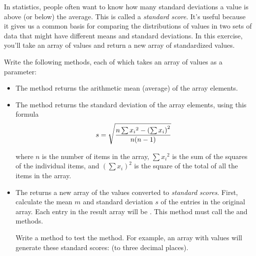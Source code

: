 \begin{exercise}
\label{ex:standardize}
In statistics, people often want to know how many standard deviations a value is above (or below) the average. This is called a {\em standard score}. It's useful because it gives us a common basis for comparing the distributions of values in two sets of data that might have different means and standard deviations. In this exercise, you'll take an array of values and return a new array of standardized values.

Write the following methods, each of which takes an array of  values as a parameter:

\begin{itemize}
\item The  method returns the arithmetic mean (average) of the array elements.

\item The  method returns the standard deviation of the array elements, using this formula
\begin{equation*}
s = \sqrt {{n \sum{x_i} ^2 - \left(\sum{x_i}\right)^2} \over {n (n - 1)}}
\end{equation*}

where $n$ is the number of items in the array, $\sum{x_i} ^2$ is the sum of the squares of the individual items, and $\left(\sum{x_i}\right)^2$ is the square of the total of all the items in the array.

\item The  returns a new array of the values converted to {\em standard scores}. First, calculate the mean $m$ and standard deviation $s$ of the entries in the original array. Each entry in the result array will be . This method must call the  and  methods.

Write a  method to test the  method. For example, an array with values
 will generate these standard scores:  (to three decimal places). 

\end{itemize}
\end{exercise}

